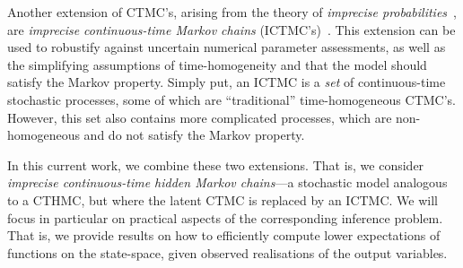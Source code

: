 \documentclass[twoside,11pt]{article}
\begin{document}

Another extension of CTMC's, arising from the theory of \emph{imprecise probabilities}~\citep{Walley:1991vk}, are \emph{imprecise continuous-time Markov chains} (ICTMC's)~\citep{Skulj:2015cq, krak2016ictmc}. This extension can be used to robustify against uncertain numerical parameter assessments, as well as the simplifying assumptions of time-homogeneity and that the model should satisfy the Markov property. %
Simply put, an ICTMC is a \emph{set} of continuous-time stochastic processes, some of which are ``traditional'' time-homogeneous CTMC's. However, this set also contains more complicated processes, which are non-homogeneous and do not satisfy the Markov property.



In this current work, we combine these two extensions. That is, we consider \emph{imprecise continuous-time hidden Markov chains}---a stochastic model analogous to a CTHMC, but where the latent CTMC is replaced by an ICTMC. We will focus in particular on practical aspects of the corresponding inference problem. That is, we provide results on how to efficiently compute lower expectations of functions on the state-space, given observed realisations of the output variables. 
\end{document}
